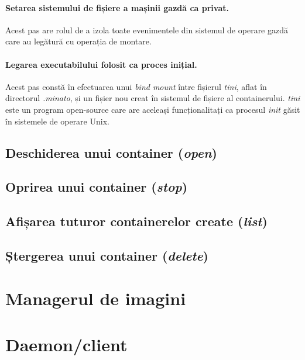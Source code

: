             \paragraph{Setarea sistemului de fișiere a mașinii gazdă ca privat.} Acest pas are rolul de a izola toate evenimentele din sistemul de operare gazdă care au legătură cu operația de montare.
            \paragraph{Legarea executabilului folosit ca proces inițial.} Acest pas constă în efectuarea unui \textit{bind mount} între fișierul \textit{tini}, aflat în directorul \textit{.minato}, și un fișier nou creat în sistemul de fișiere al containerului. \textit{tini} este un program open-source care are aceleași funcționalitați ca procesul \textit{init} găsit în sistemele de operare Unix.

        \subsection{Deschiderea unui container (\textit{open})}


        \subsection{Oprirea unui container (\textit{stop})}


        \subsection{Afișarea tuturor containerelor create (\textit{list})}


        \subsection{Ștergerea unui container (\textit{delete})}



    \section{Managerul de imagini}


    \section{Daemon/client}


